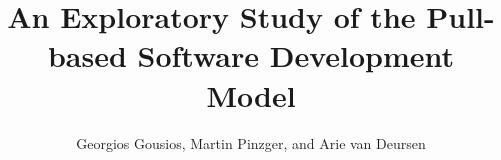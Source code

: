 \documentclass[letterpaper,twoside,10pt]{book}
\title{An Exploratory Study of the Pull-based Software Development Model}
\author{Georgios Gousios, Martin Pinzger, and Arie van Deursen}
\begin{document}
\maketitle

%



\makebackpage
\end{document}
